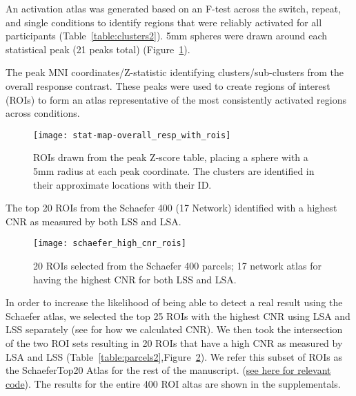 \documentclass[phd,appendix,figures]{uithesis}
\begin{document}
An activation atlas was generated based on an F-test across the switch, repeat, and single conditions
to identify regions that were reliably activated for all participants (Table~\ref{table:clusters2}).
5mm spheres were drawn around each statistical peak (21 peaks total) (Figure~\ref{fig:methroimap2}).

\begin{table}[H]
  \caption{
    The peak MNI coordinates/Z-statistic identifying clusters/sub-clusters from the overall
    response contrast.
    These peaks were used to create regions of interest (ROIs) to form an atlas representative
    of the most consistently activated regions across conditions.
  }
  \label{table:clusters2}
\end{table}

\begin{figure}[H]
  \centering
  \texttt{[image: stat-map-overall\_resp\_with\_rois]}
  \caption{
    ROIs drawn from the peak Z-score table, placing a sphere with a 5mm radius
    at each peak coordinate.
    The clusters are identified in their approximate locations
    with their ID.
  }
  \label{fig:methroimap2}
\end{figure}

\begin{table}[H]
  \caption{
    The top 20 ROIs from the Schaefer 400 (17 Network) identified with a highest CNR as measured by
    both LSS and LSA.
  }
  \label{table:parcels2}
\end{table}

\begin{figure}[H]
  \centering
  \texttt{[image: schaefer\_high\_cnr\_rois]}
  \caption{
    20 ROIs selected from the Schaefer 400 parcels; 17 network atlas for having the
    highest CNR for both LSS and LSA.
  }
  \label{fig:schaefertopmap2}
\end{figure}

In order to increase the likelihood of being able to detect a real result using the Schaefer atlas,
we selected the top 25 ROIs with the highest CNR using LSA and LSS separately
(see  for how we calculated CNR).
We then took the intersection of the two ROI sets resulting in 20 ROIs that have a high CNR
as measured by LSA and LSS (Table~\ref{table:parcels2},Figure~\ref{fig:schaefertopmap2}).
We refer this subset of ROIs as the SchaeferTop20 Atlas for the rest of the manuscript.
(\href{https://github.com/jdkent/BetaSeriesRealDataAnalysis/blob/b18b44321edf7b662a1e5ea635f64452c8d3644c/nibsAnalysis/cnr_trial_variability.ipynb}{see here for relevant code}).
The results for the entire 400 ROI altas are shown in the supplementals.
\end{document}
